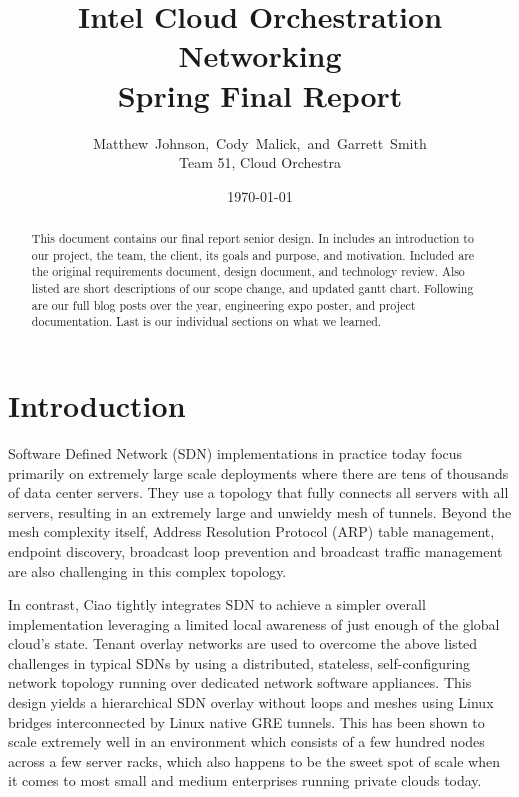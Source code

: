 \documentclass[10pt,onecolumn,journal,draftclsnofoot]{IEEEtran}
\begin{document}
\begin{titlepage}
	\title{Intel Cloud Orchestration Networking\\ Spring Final Report}
	\author{Matthew~Johnson,~Cody~Malick,~and~Garrett~Smith\\
		Team 51, Cloud Orchestra}
	\date{\today}
	\maketitle
	\vspace{4cm}
	\begin{abstract}
		\noindent This document contains our final report senior design. In includes an introduction to our project, the team, the client, its goals and purpose, and motivation. Included are the original requirements document, design document, and technology review. Also listed are short descriptions of our scope change, and updated gantt chart. Following are our full blog posts over the year, engineering expo poster, and project documentation. Last is our individual sections on what we learned. \end{abstract}

\end{titlepage}
\tableofcontents
\clearpage
\section{Introduction}
Software Defined Network (SDN) implementations in practice today focus
primarily on extremely large scale deployments where there are tens of
thousands of data center servers. They use a topology that fully connects all
servers with all servers, resulting in an extremely large and unwieldy mesh of
tunnels. Beyond the mesh complexity itself, Address Resolution Protocol (ARP)
table management, endpoint discovery, broadcast loop prevention and broadcast
traffic management are also challenging in this complex topology.

In contrast, Ciao tightly integrates SDN to achieve a simpler overall
implementation leveraging a limited local awareness of just enough of the global
cloud’s state. Tenant overlay networks are used to overcome the above listed
challenges in typical SDNs by using a distributed, stateless, self-configuring
network topology running over dedicated network software appliances. This design
yields a hierarchical SDN overlay without loops and meshes using Linux bridges
interconnected by Linux native GRE tunnels. This has been shown to scale
extremely well in an environment which consists of a few hundred nodes across a
few server racks, which also happens to be the sweet spot of scale when it comes
to most small and medium enterprises running private clouds today.
\end{document}

